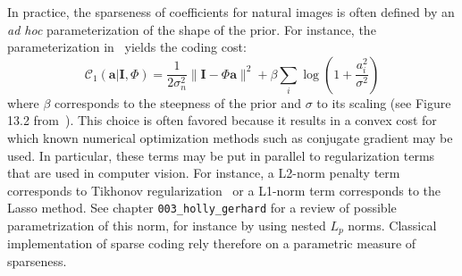 \documentclass[a4paper, 11pt]{book}
\newcommand{\image}{\mathbf{I}} %
\newcommand{\dico}{\Phi} %
\newcommand{\coef}{\mathbf{a}} %
\begin{document}
In practice, the sparseness of coefficients for natural images is often defined by an \emph{ad hoc} parameterization of the shape of the prior. For instance, the parameterization in~\citet{Olshausen97} yields the coding cost:%
\begin{equation}
\mathcal{C}_1( \coef | \image , \dico) =\frac{1}{2\sigma_n^2} \| \image - \dico \coef \|^2 + \beta \sum_i \log ( 1 + \frac{a_i^2}{\sigma^2} )%
\label{eq:sparse_cost}%
\end{equation}
where $\beta$ corresponds to the steepness of the prior and $\sigma$ to its scaling (see Figure 13.2 from~\citep{Olshausen02}). This choice is often favored because it results in a convex cost for which known numerical optimization methods such as conjugate gradient may be used. In particular, these terms may be put in parallel to regularization terms that are used in computer vision. For instance, a L2-norm penalty term corresponds to Tikhonov regularization~\citep{Tikhonov77} or a L1-norm term corresponds to the Lasso method.
See chapter \verb+003_holly_gerhard+ for a review of possible parametrization of this norm,
for instance by using nested $L_p$ norms.
Classical implementation of sparse coding rely therefore on a parametric measure of sparseness.
\end{document}
